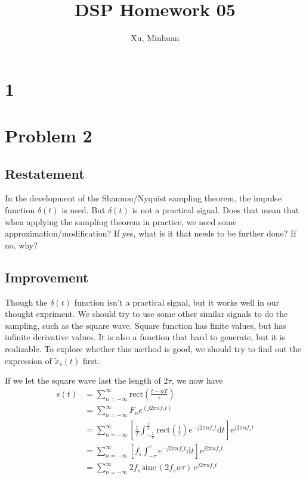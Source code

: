 \documentclass{article}
\begin{document}
\title{DSP Homework 05}
\author{Xu, Minhuan}
\maketitle
\tableofcontents
\begin{abstract}

\end{abstract}

\section{1}

\section{Problem 2}

\subsection{Restatement}
In the development of the Shannon/Nyquist sampling theorem, the impulse function $\delta (t)$ is used. But $\delta (t)$ is not a practical signal. Does that mean that when applying the sampling theorem in practice, we need some approximation/modification? If yes, what is it that needs to be further done? If no, why?

\subsection{Improvement}

Though the $\delta (t)$ function isn't a practical signal, but it works well in our thought expriment. We should try to use some other similar signals to do the sampling, such as the square wave. Square function has finite values, but has infinite derivative values. It is also a function that hard to generate, but it is realizable. To explore whether this method is good, we should try to find out the expression of $\widetilde{x}_s(t)$ first.

If we let the square wave last the length of $2\tau$, we now have
\begin{equation}
    \begin{aligned}
        s(t) &= \sum_{n = -\infty}^{\infty} \mathrm{rect} (\frac{t - nT}{\tau}) \\
        &= \sum_{n = -\infty}^{\infty}F_n e^(j2 \pi n f_s t) \\
        &= \sum_{n = -\infty}^{\infty}\left[ \frac{1}{T} \int_{-\frac1T}^{\frac1T} \mathrm{rect}(\frac{t}{\tau}) e^{-j2 \pi n f_s t} \mathrm{d}t \right] e^{j2 \pi n f_s t} \\
        &= \sum_{n = -\infty}^{\infty}\left[ f_s \int_{-\tau}^{\tau} e^{-j2 \pi n f_s t} \mathrm{d}t \right] e^{j2 \pi n f_s t} \\
        &= \sum_{n = -\infty}^{\infty}2f_s\, \mathrm{sinc} \,( 2f_s n\tau)\, e^{j2 \pi n f_s t} \label{rect_st} \\
    \end{aligned}
\end{equation}
\end{document}
